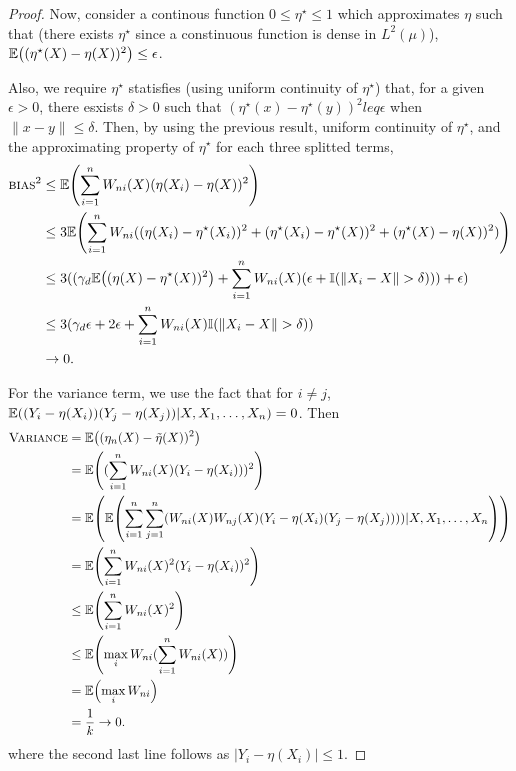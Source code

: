 \begin{proof}
  Now, consider a continous function $0 \leq \eta^{\star} \leq 1$
  which approximates $\eta$ such that (there exists $\eta^{\star}$
  since a constinuous function is dense in $L^{2}(\mu)$),
  $\E{(\eta^{\star}(X) - \eta(X))^{2}} \leq \epsilon$.

  Also, we require $\eta^{\star}$ statisfies (using uniform continuity
  of $\eta^{\star}$) that, for a given $\epsilon > 0$, there esxists
  $\delta > 0$ such that $(\eta^{\star}(x) - \eta^{\star}(y))^{2} leq
  \epsilon$ when $\| x - y \| \leq \delta$.  Then, by using the
  previous result, uniform continuity of $\eta^{\star}$, and the
  approximating property of $\eta^{\star}$ for each three splitted
  terms,
  \begin{align}
    \label{eq:162}
    \textsc{bias}^{2} &\leq \E{\sum_{i=1}^{n} W_{ni}(X)(\eta(X_{i}) -
      \eta(X))^{2}} \\
    \label{eq:163}
    &\leq 3 \E{\sum_{i=1}^{n} W_{ni}((\eta(X_{i}) - \eta^{\star}(X_{i}))^{2}
    + (\eta^{\star}(X_{i}) - \eta^{\star}(X))^{2} + (\eta^{\star}(X) -
    \eta(X))^{2})} \\
  \label{eq:164}
  &\leq 3 ((\gamma_{d} \E{(\eta(X) - \eta^{\star}(X))^{2}} +
  \sum_{i=1}^{n} W_{ni}(X) (\epsilon + \I{\| X_{i} - X \| > \delta}))
  + \epsilon) \\
  \label{eq:165}
  &\leq 3(\gamma_{d} \epsilon + 2 \epsilon + \sum_{i=1}^{n} W_{ni}(X)
  \I{\| X_{i} - X \| > \delta}) \\
  \label{eq:166}
  &\rightarrow 0.
  \end{align}

  For the variance term, we use the fact that for $i \neq j$,
  $\E{(Y_{i} - \eta(X_{i}))(Y_{j} - \eta(X_{j})) | X, X_{1}, \dots,
    X_{n}} = 0$. Then
  \begin{align}
    \label{eq:167}
    \textsc{Variance} &= \E{(\eta_{n}(X) - \tilde \eta(X))^{2}} \\
    \label{eq:168}
    &= \E{(\sum_{i=1}^{n} W_{ni}(X)(Y_{i} - \eta(X_{i})))^{2}} \\
    \label{eq:169}
    &= \E{\E{\sum_{i=1}^{n} \sum_{j=1}^{n} (W_{ni}(X) W_{nj}(X)(Y_{i}
        - \eta(X_{i})(Y_{j} - \eta(X_{j})))) | X, X_{1}, \dots,
        X_{n}}} \\
    \label{eq:170}
    &= \E{\sum_{i=1}^{n} W_{ni}(X)^{2} (Y_{i} - \eta(X_{i}))^{2}} \\
    \label{eq:171}
    &\leq \E{\sum_{i=1}^{n} W_{ni}(X)^{2}} \\
    \label{eq:172}
    &\leq \E{\max_{i} W_{ni}(\sum_{i=1}^{n} W_{ni}(X))} \\
    \label{eq:173}
    &= \E{\max_{i} W_{ni}} \\
    \label{eq:174}
    &= \frac{1}{k} \rightarrow 0.
  \end{align} where the second last line follows as $|Y_{i} -
  \eta(X_{i}) | \leq 1$.
\end{proof} 

